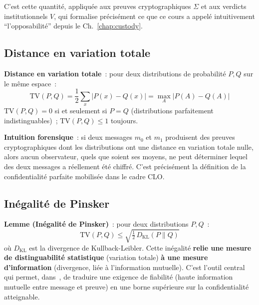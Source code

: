 C'est cette quantité, appliquée aux preuves cryptographiques $\Sigma$
et aux verdicts institutionnels $V$, qui formalise précisément ce
que ce cours a appelé intuitivement ``l'opposabilité'' depuis le
Ch.~\ref{chap:custody}.

\subsection{Distance en variation totale}

\begin{boxdef}
\textbf{Distance en variation totale}~: pour deux distributions de
probabilité $P, Q$ sur le même espace~:
\begin{equation}
\mathrm{TV}(P,Q) = \frac{1}{2}\sum_{x} |P(x) - Q(x)|
= \max_{A} |P(A) - Q(A)|
\label{eq:tv}
\end{equation}
$\mathrm{TV}(P,Q) = 0$ si et seulement si $P = Q$ (distributions
parfaitement indistinguables)~; $\mathrm{TV}(P,Q) \leq 1$ toujours.
\end{boxdef}

\textbf{Intuition forensique}~: si deux messages $m_0$ et $m_1$
produisent des preuves cryptographiques dont les distributions ont
une distance en variation totale nulle, alors aucun observateur,
quels que soient ses moyens, ne peut déterminer lequel des deux
messages a réellement été chiffré. C'est précisément la définition
de la confidentialité parfaite mobilisée dans le cadre CLO.

\subsection{Inégalité de Pinsker}

\begin{boxjuris}
\textbf{Lemme (Inégalité de Pinsker)}~: pour deux distributions
$P, Q$~:
\begin{equation}
\mathrm{TV}(P,Q) \leq \sqrt{\tfrac{1}{2}\,D_{\mathrm{KL}}(P \| Q)}
\label{eq:pinsker}
\end{equation}
où $D_{\mathrm{KL}}$ est la divergence de Kullback-Leibler.
Cette inégalité \textbf{relie une mesure de distinguabilité
statistique} (variation totale) \textbf{à une mesure
d'information} (divergence, liée à l'information mutuelle).
C'est l'outil central qui permet, dans~\cite{minka2026conditional},
de traduire une exigence de fiabilité (haute information mutuelle
entre message et preuve) en une borne supérieure sur la
confidentialité atteignable.
\end{boxjuris}

